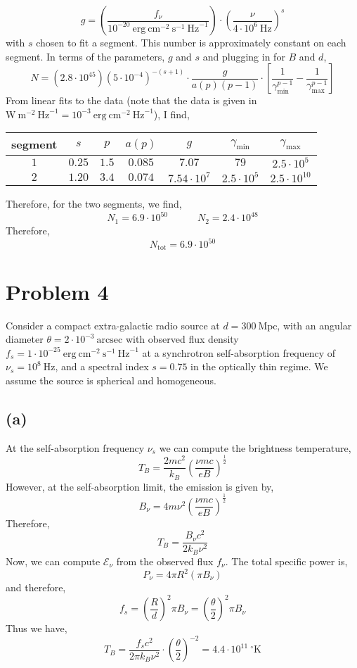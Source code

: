 \documentclass[12pt]{article}
\begin{document}
\[ g = \left( \frac{f_\nu}{10^{-20} \: \mathrm{erg} \: \mathrm{cm}^{-2} \: \mathrm{s}^{-1} \: \mathrm{Hz}^{-1}} \right) \cdot \left( \frac{\nu}{4 \cdot 10^6 \: \mathrm{Hz}} \right)^{s} \]  
with $s$ chosen to fit a segment. This number is approximately constant on each segment. In terms of the parameters, $g$ and $s$ and plugging in for $B$ and $d$,
\[ N = (2.8 \cdot 10^{45}) \left( 5 \cdot 10^{-4} \right)^{-(s+1)} \cdot \frac{g}{a(p)(p-1)} \cdot \left[ \frac{1}{\gamma_{\text{min}}^{p - 1}} - \frac{1}{\gamma_{\text{max}}^{p-1}} \right]  \]
From linear fits to the data (note that the data is given in $\mathrm{W} \: \mathrm{m}^{-2} \: \mathrm{Hz}^{-1} = 10^{-3} \: \mathrm{erg} \: \mathrm{cm}^{-2} \: \mathrm{Hz}^{-1}$), I find,
\begin{center}
 \begin{tabular}{||c c c c c c c||} 
 \hline
 segment & $s$ & $p$ & $a(p)$ & $g$ & $\gamma_{\text{min}}$ & $\gamma_{\text{max}}$
 \\ [0.5ex] 
 \hline\hline
 $1$ & $0.25$ & $1.5$ & $0.085$ & $7.07$ & $79$ & $2.5 \cdot 10^5$ \\ 
 \hline
 $2$ & $1.20$ & $3.4$ & $0.074$ & $7.54 \cdot 10^7$ & $2.5 \cdot 10^5$ & $2.5 \cdot 10^{10}$ \\
 \hline
\end{tabular}
\end{center}
Therefore, for the two segments, we find,
\[ N_1 = 6.9 \cdot 10^{50} \quad \quad \quad N_2 = 2.4 \cdot 10^{48} \]
Therefore,
\[ N_{\text{tot}} = 6.9 \cdot 10^{50} \]

\section{Problem 4} 

Consider a compact extra-galactic radio source at $d = 300 \: \mathrm{Mpc}$, with an angular diameter $\theta = 2 \cdot 10^{-3} \: \mathrm{arcsec}$ with observed flux density $f_{s} = 1 \cdot 10^{-25} \: \mathrm{erg} \: \mathrm{cm}^{-2} \: \mathrm{s}^{-1} \: \mathrm{Hz}^{-1}$ at a synchrotron self-absorption frequency of $\nu_s = 10^{8} \: \mathrm{Hz}$, and a spectral index $s = 0.75$ in the optically thin regime. We assume the source is spherical and homogeneous.

\subsection*{(a)}

At the self-absorption frequency $\nu_s$ we can compute the brightness temperature,
\[  T_B = \frac{2 m c^2}{k_B} \left( \frac{\nu m c}{e B} \right)^{\frac{1}{2}}  \]
However, at the self-absorption limit, the emission is given by,
\[  B_\nu = 4 m \nu^2 \left( \frac{\nu m c}{e B} \right)^{\frac{1}{2}} \]
Therefore,
\[ T_B = \frac{B_\nu c^2}{2 k_B \nu^2} \]
Now, we can compute $\mathcal{E}_\nu$ from the observed flux $f_\nu$. The total specific power is,
\[ P_\nu = 4 \pi R^2 (\pi B_\nu) \]
and therefore,
\[ f_s = \left( \frac{R}{d} \right)^2 \pi B_\nu = \left( \frac{\theta}{2} \right)^2 \pi B_\nu \]
Thus we have,
\[ T_B = \frac{f_s c^2}{2 \pi k_B \nu^2} \cdot \left( \frac{\theta}{2} \right)^{-2} = 4.4 \cdot 10^{11} \: ^\circ \mathrm{K} \]
\end{document}
